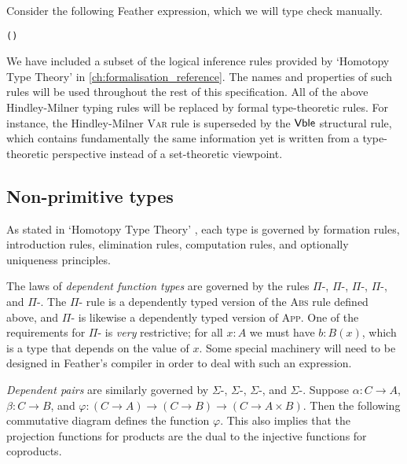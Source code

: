 \documentclass[UKenglish, 11pt, a4paper, parskip=half]{scrbook}
\begin{document}
Consider the following Feather expression, which we will type check manually.

\begin{lstlisting}
()
\end{lstlisting}

\iffalse{}

We have included a subset of the logical inference rules provided by `Homotopy Type Theory' \cite{hottbook} in \cref{ch:formalisation_reference}.
The names and properties of such rules will be used throughout the rest of this specification.
All of the above Hindley-Milner typing rules will be replaced by formal type-theoretic rules.
For instance, the Hindley-Milner \textsc{Var} rule is superseded by the \(\mathsf{Vble}\) structural rule, which contains fundamentally the same information yet is written from a type-theoretic perspective instead of a set-theoretic viewpoint.

\subsection{Non-primitive types}

As stated in `Homotopy Type Theory' \cite{hottbook}, each type is governed by formation rules, introduction rules, elimination rules, computation rules, and optionally uniqueness principles.


The laws of \textit{dependent function types} are governed by the rules \( \Pi \)-\rform, \( \Pi \)-\rintro, \( \Pi \)-\relim, \( \Pi \)-\rcomp, and \( \Pi \)-\runiq.
The \( \Pi \)-\rintro{} rule is a dependently typed version of the \textsc{Abs} rule defined above, and \( \Pi \)-\relim{} is likewise a dependently typed version of \textsc{App}.
One of the requirements for \( \Pi \)-\rintro{} is \textit{very} restrictive; for all \( x:A \) we must have \( b:B(x) \), which is a type that depends on the value of \( x \).
Some special machinery will need to be designed in Feather's compiler in order to deal with such an expression.

\textit{Dependent pairs} are similarly governed by \( \Sigma \)-\rform, \( \Sigma \)-\rintro, \( \Sigma \)-\relim, and \( \Sigma \)-\rcomp.
Suppose \( \alpha : C \to A \), \( \beta : C \to B \), and \( \varphi : (C \to A) \to (C \to B) \to (C \to A \times B) \).
Then the following commutative diagram defines the function \( \varphi \).
This also implies that the projection functions for products are the dual to the injective functions for coproducts.
\end{document}
